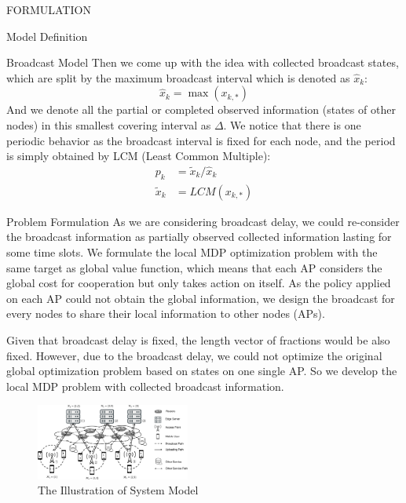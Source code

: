 \documentclass[10pt, conference, letterpaper]{IEEEtran}
\begin{document}
\begin{section}{FORMULATION}
\begin{subsection}{Model Definition}
\begin{subsubsection}{Broadcast Model}
                Then we come up with the idea with collected broadcast states, which are split by the maximum broadcast interval which is denoted as $\hat{x}_k$:
                $$
                \hat{x}_k = \max(x_{k,*})
                $$
                And we denote all the partial or completed observed information (states of other nodes) in this smallest covering interval as $\Delta$.
                We notice that there is one periodic behavior as the broadcast interval is fixed for each node, and the period is simply obtained by LCM (Least Common Multiple):
                \begin{align*}
                    p_{k} &= \tilde{x}_k/\hat{x}_k
                    \\
                    \tilde{x}_k &= LCM(x_{k,*})
                \end{align*}
            \end{subsubsection}

        \end{subsection}

        \begin{subsection}{Problem Formulation}
            As we are considering broadcast delay, we could re-consider the broadcast information as partially observed collected information lasting for some time slots. We formulate the local MDP optimization problem with the same target as global value function, which means that each AP considers the global cost for cooperation but only takes action on itself. As the policy applied on each AP could not obtain the global information, we design the broadcast for every nodes to share their local information to other nodes (APs).
            
            Given that broadcast delay is fixed, the length vector of fractions would be also fixed.
            However, due to the broadcast delay, we could not optimize the original global optimization problem based on states on one single AP. So we develop the local MDP problem with collected broadcast information.

            \begin{figure}[h]
                \centering
                \includegraphics[width=0.45\textwidth, trim={0.5cm 0.5cm 0.5cm 0.5cm}, clip]{system-model.pdf}
                \caption{The Illustration of System Model}
                \label{fig:system}
            \end{figure}


\end{subsection}
\end{section}
\end{document}
